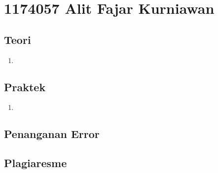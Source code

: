 \section{1174057 Alit Fajar Kurniawan}
	\subsection{Teori}
		\begin{enumerate}
			\item
		\end{enumerate}

	\subsection{Praktek}
		\begin{enumerate}
			\item
		\end{enumerate}

	\subsection{Penanganan Error}

	\subsection{Plagiaresme}
